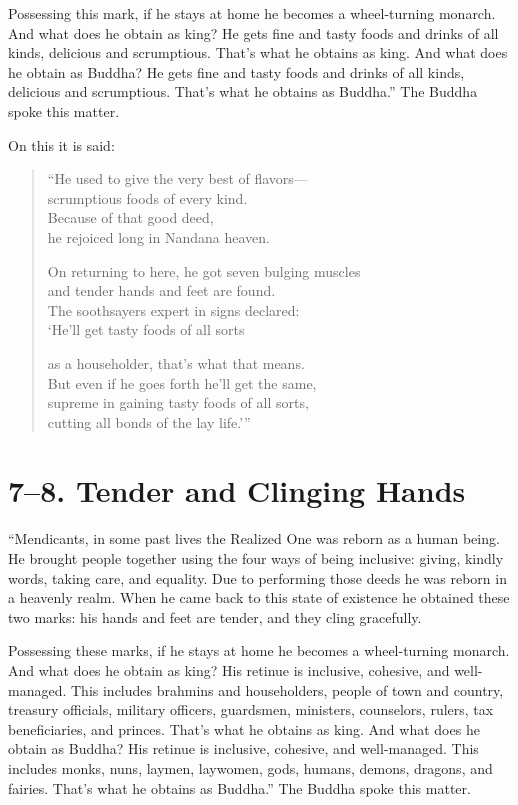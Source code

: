 \documentclass[12pt,openany]{book}%
\begin{document}
Possessing this mark, if he stays at home he becomes a wheel-turning monarch. And what does he obtain as king? He gets fine and tasty foods and drinks of all kinds, delicious and scrumptious. That’s what he obtains as king. And what does he obtain as Buddha? He gets fine and tasty foods and drinks of all kinds, delicious and scrumptious. That’s what he obtains as Buddha.” The Buddha spoke this matter. 

On this it is said: 

\begin{verse}%
“He used to give the very best of flavors—\\
scrumptious foods of every kind. \\
Because of that good deed, \\
he rejoiced long in Nandana heaven. 

On returning to here, he got seven bulging muscles \\
and tender hands and feet are found. \\
The soothsayers expert in signs declared: \\
‘He’ll get tasty foods of all sorts 

as a householder, that’s what that means. \\
But even if he goes forth he’ll get the same, \\
supreme in gaining tasty foods of all sorts, \\
cutting all bonds of the lay life.’” 

%
\end{verse}

\section*{7–8. Tender and Clinging Hands }

“Mendicants, in some past lives the Realized One was reborn as a human being. He brought people together using the four ways of being inclusive: giving, kindly words, taking care, and equality. Due to performing those deeds he was reborn in a heavenly realm. When he came back to this state of existence he obtained these two marks: his hands and feet are tender, and they cling gracefully. 

Possessing these marks, if he stays at home he becomes a wheel-turning monarch. And what does he obtain as king? His retinue is inclusive, cohesive, and well-managed. This includes brahmins and householders, people of town and country, treasury officials, military officers, guardsmen, ministers, counselors, rulers, tax beneficiaries, and princes. That’s what he obtains as king. And what does he obtain as Buddha? His retinue is inclusive, cohesive, and well-managed. This includes monks, nuns, laymen, laywomen, gods, humans, demons, dragons, and fairies. That’s what he obtains as Buddha.” The Buddha spoke this matter. 
\end{document}
